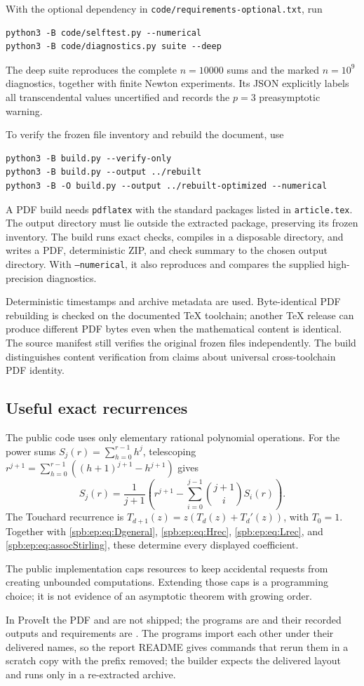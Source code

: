 With the optional dependency in \texttt{code/requirements-optional.txt},
run
\begin{verbatim}
python3 -B code/selftest.py --numerical
python3 -B code/diagnostics.py suite --deep
\end{verbatim}
The deep suite reproduces the complete $n=10000$ sums and the marked
$n=10^9$ diagnostics, together with finite Newton experiments.
Its JSON explicitly labels all transcendental values uncertified and
records the $p=3$ preasymptotic warning.

To verify the frozen file inventory and rebuild the document, use
\begin{verbatim}
python3 -B build.py --verify-only
python3 -B build.py --output ../rebuilt
python3 -B -O build.py --output ../rebuilt-optimized --numerical
\end{verbatim}
A PDF build needs \texttt{pdflatex} with the standard packages listed in
\texttt{article.tex}. The output directory must lie outside the extracted
package, preserving its frozen inventory. The build runs exact checks,
compiles in a disposable directory, and writes a PDF, deterministic ZIP,
and check summary to the chosen output directory. With \texttt{--numerical},
it also reproduces and compares the supplied high-precision diagnostics.

Deterministic timestamps and archive metadata are used. Byte-identical
PDF rebuilding is checked on the documented TeX toolchain; another TeX
release can produce different PDF bytes even when the mathematical content
is identical. The source manifest still verifies the original frozen
files independently. The build distinguishes content verification from
claims about universal cross-toolchain PDF identity.

\subsection*{Useful exact recurrences}
The public code uses only elementary rational polynomial operations.
For the power sums $S_j(r)=\sum_{h=0}^{r-1}h^j$, telescoping
$r^{j+1}=\sum_{h=0}^{r-1}((h+1)^{j+1}-h^{j+1})$ gives
\[
 S_j(r)=\frac1{j+1}\left(r^{j+1}
                -\sum_{i=0}^{j-1}\binom{j+1}{i}S_i(r)\right).
\]
The Touchard recurrence is
$T_{d+1}(z)=z(T_d(z)+T_d'(z))$, with $T_0=1$.
Together with \eqref{spb:ep:eq:Dgeneral}, \eqref{spb:ep:eq:Hrec}, \eqref{spb:ep:eq:Lrec}, and
\eqref{spb:ep:eq:assocStirling}, these determine every displayed coefficient.

The public implementation caps resources to keep accidental requests from
creating unbounded computations. Extending those caps is a programming
choice; it is not evidence of an asymptotic theorem with growing order.
\begin{writenote}
In ProveIt the PDF and  are not shipped; the programs
are  and their recorded outputs and requirements
are . The programs import each other under their
delivered names, so the report README gives commands that rerun them in a
scratch copy with the prefix removed; the builder expects the delivered layout
and runs only in a re-extracted archive.
\end{writenote}
